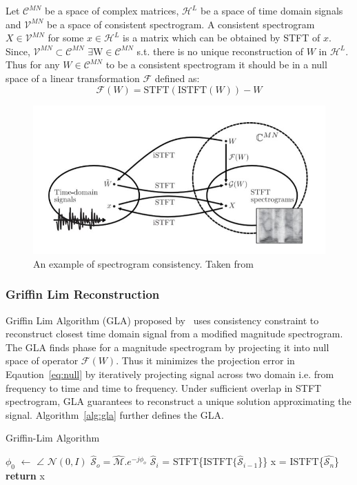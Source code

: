 Let $\mathcal{C}^{M N}$ be a space of complex matrices, $\mathcal{H}^L$ be a space of time domain signals and $\mathcal{V}^{M N}$ be a space of consistent spectrogram. A consistent spectrogram $X\in\mathcal{V}^{MN}$  for some $x\in\mathcal{H}^L$ is a matrix which can be obtained by STFT of $x$. Since, $\mathcal{V}^{MN} \subset \mathcal{C}^{MN}$ $\exists  $W$\in\mathcal{C}^{MN}$ s.t. there is no unique reconstruction of $W$ in $\mathcal{H}^L$. Thus for any $W\in\mathcal{C}^{MN}$ to be a consistent spectrogram it should be in a null space of a linear transformation $\mathcal{F}$ defined as:
\begin{equation}
\label{eq:null}
    \mathcal{F}(W) = \text{STFT}(\text{ISTFT}(W)) - W
\end{equation}


\begin{figure}
    \centering
    \includegraphics[width=0.55\columnwidth]{master_thesis_template/figs/spec_consistency.JPG}
    \caption{An example of spectrogram consistency. Taken from~\cite{le2010fast}}
    \label{fig:spec_con}
\end{figure}
\subsubsection{Griffin Lim Reconstruction}
Griffin Lim Algorithm (GLA) proposed by~\cite{griffin1984signal} uses consistency constraint to reconstruct closest time domain signal from a modified magnitude spectrogram. The GLA finds phase for a magnitude spectrogram by projecting it into null space of operator $\mathcal{F}(W)$. Thus it minimizes the projection error in Eqaution~\ref{eq:null} by iteratively projecting signal across two domain i.e. from frequency to time and time to frequency. Under sufficient overlap in STFT spectrogram, GLA guarantees to reconstruct a unique solution approximating the signal. Algorithm~\ref{alg:gla} further defines the GLA.
\begin{algorithm}
\caption{Griffin-Lim Algorithm}
\label{alg:gla}
\begin{algorithmic}[1]
 
\State $\phi_0$ $\leftarrow$ $\angle$ $\mathcal{N}(0,I)$ 
\State $\hat{\mathcal{S}}_o = \mathcal{\hat{M}}.e^{-j\phi_o}$ 
\State $\hat{\mathcal{S}}_i$ = $\text{STFT}$\{$\text{ISTFT}\{\hat{\mathcal{S}}_{i-1}$\}\}
\EndFor
\State x = $\text{ISTFT}$\{$\hat{\mathcal{S}_n}$\}
\State \textbf{return} x
\EndProcedure
\end{algorithmic}
\end{algorithm}

